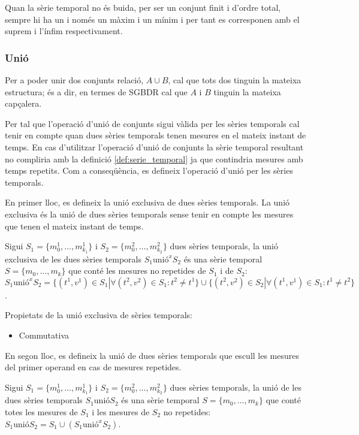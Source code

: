 Quan la sèrie temporal no és buida, per
ser un conjunt finit i d'ordre total, sempre hi ha un i només un màxim
i un mínim i per tant es corresponen amb el suprem i l'ínfim
respectivament.




\subsubsection{Unió}

Per a poder unir dos conjunts relació, $A \cup B$, cal que tots dos
tinguin la mateixa estructura; és a dir, en termes de SGBDR cal que
$A$ i $B$ tinguin la mateixa capçalera.


Per tal que l'operació d'unió de conjunts sigui vàlida per les sèries
temporals cal tenir en compte quan dues sèries temporals tenen mesures
en el mateix instant de temps. En cas d'utilitzar l'operació d'unió de
conjunts la sèrie temporal resultant no compliria amb la definició
\ref{def:serie_temporal} ja que contindria mesures amb temps
repetits. Com a conseqüència, es defineix l'operació d'unió per les
sèries temporals.


En primer lloc, es defineix la unió exclusiva de dues sèries temporals.  La
unió exclusiva és la unió de dues sèries temporals sense tenir en
compte les mesures que tenen el mateix instant de temps.

\begin{definition}
  Sigui $S_1=\{m_0^1, \dotsc, m_{k_1}^1\}$ i $S_2=\{m_0^2, \dotsc,
  m_{k_2}^2\}$ dues sèries temporals, la unió exclusiva de les dues
  sèries temporals $S_1 \text{unió}^x S_2$ és una sèrie temporal
  $S=\{m_0, \dotsc, m_k\}$ que conté les mesures no repetides de $S_1$
  i de $S_2$: $S_1 \text{unió}^x S_2 = \{ (t^1,v^1) \in S_1 | \forall
  (t^2,v^2)\in S_1 : t^2 \neq t^1 \} \cup \{ (t^2,v^2) \in S_2 |
  \forall (t^1,v^1)\in S_1 : t^1 \neq t^2 \}$.
\end{definition}

Propietats de la unió exclusiva de sèries temporals:
\begin{itemize}
\item Commutativa
\end{itemize}


En segon lloc, es defineix la unió de dues sèries temporals que escull
les mesures del primer operand en cas de mesures repetides.

\begin{definition}[unió]
  Sigui $S_1=\{m_0^1, \dotsc, m_{k_1}^1\}$ i $S_2=\{m_0^2, \dotsc,
  m_{k_2}^2\}$ dues sèries temporals, la unió de les dues sèries
  temporals $S_1 \text{unió} S_2$ és una sèrie temporal $S=\{m_0, \dotsc,
  m_k\}$ que conté totes les mesures de $S_1$ i les mesures de $S_2$
  no repetides: $S_1 \text{unió} S_2 = S_1 \cup (S_1 \text{unió}^x S_2)$. 

\end{definition}

